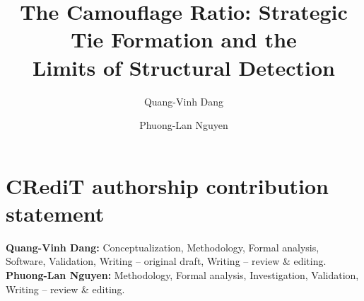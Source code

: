 \documentclass[preprint,12pt,authoryear]{elsarticle}
\begin{document}
\begin{frontmatter}

\title{The Camouflage Ratio: Strategic Tie Formation and the\\
       Limits of Structural Detection}

\author[buv]{Quang-Vinh Dang}
\author[buv]{Phuong-Lan Nguyen}


\end{frontmatter}

\section*{CRediT authorship contribution statement}

\textbf{Quang-Vinh Dang:} Conceptualization, Methodology, Formal analysis, Software,
Validation, Writing -- original draft, Writing -- review \& editing.
\textbf{Phuong-Lan Nguyen:} Methodology, Formal analysis, Investigation, Validation,
Writing -- review \& editing.
\end{document}
